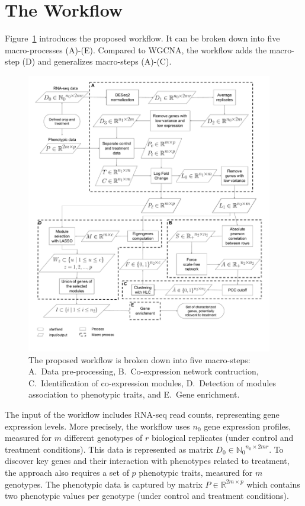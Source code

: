 \section*{The Workflow}
\label{sec.framework}


Figure~\ref{fig:flow_chart} introduces the proposed workflow.
It can be broken down into five
macro-processes (A)-(E). Compared to
WGCNA, the workflow adds the macro-step (D) and generalizes macro-steps (A)-(C).
\vspace{0.5cm}

\begin{figure}[htbp]
  \centering
    \includegraphics[clip,width=0.96\textwidth]{figures/figure1.pdf}
  \caption[The proposed workflow is broken down into five macro-steps]%
  {The proposed workflow is broken down into five macro-steps:
    A.~Data pre-processing, B.~Co-expression network
    contruction, C.~Identification of co-expression modules,
    D.~Detection of modules association to phenotypic traits, and
    E.~Gene enrichment.}
  \label{fig:flow_chart}
\end{figure}

The input of the workflow includes RNA-seq read counts, representing gene expression
levels. More precisely, the workflow uses $n_0$ gene expression
profiles, measured for $m$ different genotypes 
of $r$ biological replicates (under
control and treatment conditions). This
data is represented as matrix $D_0 \in {\mathbb{N}_0}^{n_0
  \times 2mr}$. To discover key genes and their interaction
with phenotypes related to treatment, the approach also
requires a set of $p$ phenotypic traits, measured for $m$
genotypes. The phenotypic data is captured by matrix $P \in
\mathbb{R}^{2m \times p}$ which contains two phenotypic values per
genotype (under control and treatment
conditions).

